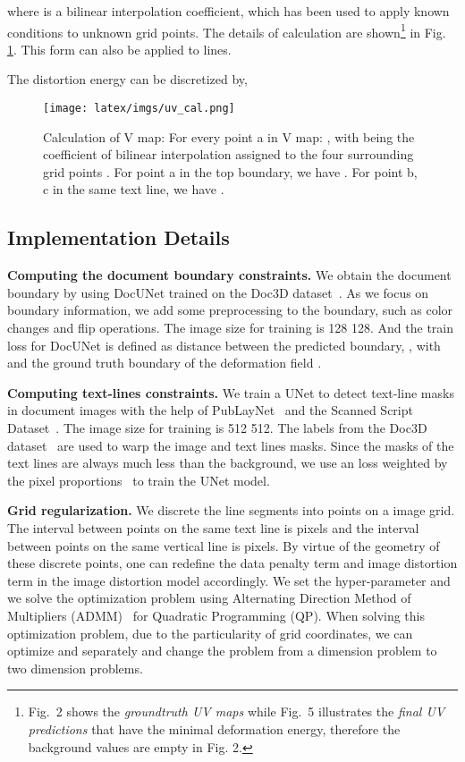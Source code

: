 \documentclass[10pt,twocolumn,letterpaper]{article}
\newcommand{\myparagraph}[1]{\vspace{1pt} \noindent \textbf{#1} }
\begin{document}
where  is a bilinear interpolation coefficient, which has been used to apply known conditions to unknown grid points. The details of calculation are shown\footnote{Fig.~2 shows the \textit{groundtruth UV maps} while Fig.~5 illustrates the \textit{final UV predictions} that have the minimal deformation energy, therefore the background values are empty in Fig. 2.} in Fig. \ref{fig:uv_cal}. This form can also be applied to lines.

The distortion energy  can be discretized by,

  

\begin{figure}[!t]
  \centering
\texttt{[image: latex/imgs/uv\_cal.png]}

   \caption{Calculation of V map: For every point a in V map: , with  being the coefficient of bilinear interpolation assigned to the four surrounding grid points . For point a in the top boundary, we have . For point b, c in the same text line, we have . }
   \label{fig:uv_cal}
  \vspace{2mm}
\end{figure}


\subsection{Implementation Details}

\myparagraph{Computing the document boundary constraints.} We obtain the document boundary by using DocUNet trained on the Doc3D dataset~\cite{Das_2019_ICCV}. As we focus on boundary information, we add some preprocessing to the boundary, such as color changes and flip operations. The image size for training is 128  128. And the train loss for DocUNet is defined as  distance between the predicted boundary, \ie,  with  and the ground truth boundary of the deformation field . 


\myparagraph{Computing text-lines constraints.}
We train a UNet to detect text-line masks in document images with the help of PubLayNet~\cite{zhong2019publaynet} and the Scanned Script Dataset~\cite{Scanned2019}.
The image size for training is 512  512. The  labels from the Doc3D dataset~\cite{Das_2019_ICCV} are used to warp the image and text lines masks. 
Since the masks of the text lines are always much less than the background, we use an  loss weighted by the pixel proportions~\cite{xue2019learning} to train the UNet model. 

\myparagraph{Grid regularization.} We discrete the line segments into points on a  image grid. The interval between points on the same text line is  pixels and the interval between points on the same vertical line is  pixels. By virtue of the geometry of these discrete points, one can redefine the data penalty term and image distortion term in the image distortion model accordingly. We set the hyper-parameter  and we solve the optimization problem using Alternating Direction Method of Multipliers (ADMM)~\cite{diamond2016cvxpy} for Quadratic Programming (QP). When solving this optimization problem, due to the particularity of grid coordinates, we can optimize  and  separately and change the problem from a  dimension problem to two  dimension problems.
\end{document}
